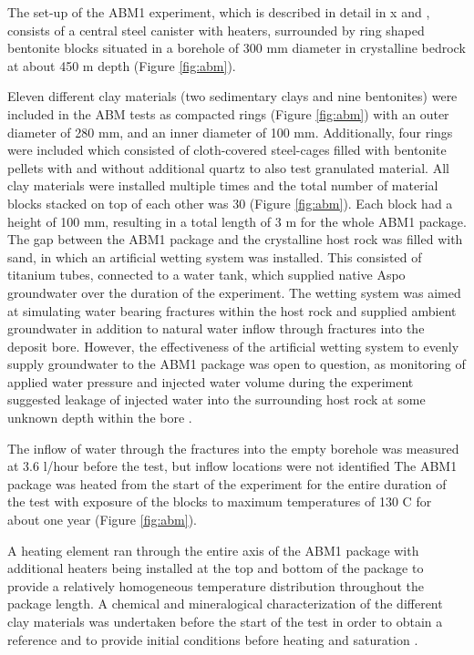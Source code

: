 The set-up of the ABM1 experiment, which is described in detail
in x 
and \cite{svensson_2011}, 
consists of a central
steel canister with heaters, surrounded by ring shaped bentonite
blocks situated in a borehole of 300 mm diameter in crystalline
bedrock at about 450 m depth (Figure \ref{fig:abm}). 

Eleven different clay materials
(two sedimentary clays and nine bentonites) were included in
the ABM tests as compacted rings 
(Figure \ref{fig:abm}) 
with an outer diameter of 280 mm, and an inner diameter of 100 mm. 
Additionally, four rings were included which consisted of cloth-covered
steel-cages filled with bentonite pellets with and without additional
quartz to also test granulated material. All clay materials
were installed multiple times and the total number of material
blocks stacked on top of each other was 30 (Figure \ref{fig:abm}). 
Each block had a height of 100 mm, resulting in a total length of 3 m for the whole
ABM1 package. The gap between the ABM1 package and the crystalline
host rock was filled with sand, in which an artificial wetting
system was installed. This consisted of titanium tubes, connected to
a water tank, which supplied native 
Aspo groundwater over the
duration of the experiment. The wetting system was aimed at
simulating water bearing fractures within the host rock and supplied
ambient groundwater in addition to natural water inflow
through fractures into the deposit bore. However, the effectiveness
of the artificial wetting system to evenly supply groundwater to the
ABM1 package was open to question, as monitoring of applied
water pressure and injected water volume during the experiment
suggested leakage of injected water into the surrounding host rock
at some unknown depth within the bore \citep{svensson_2011}. 

The inflow of water through the fractures into the empty borehole was
measured at 3.6 l/hour before the test, but inflow locations were
not identified 
The ABM1 package was heated from the start of the experiment 
for the entire duration of the test
with exposure of the blocks to maximum temperatures of 130 C
for about one year (Figure \ref{fig:abm}). 

A heating element ran through the entire
axis of the ABM1 package with additional heaters being installed at
the top and bottom of the package to provide a relatively homogeneous
temperature distribution throughout the package length.
A chemical and mineralogical characterization of the different
clay materials was undertaken before the start of the test in order to
obtain a reference and to provide initial conditions before heating
and saturation \citep{svensson_2011}.

